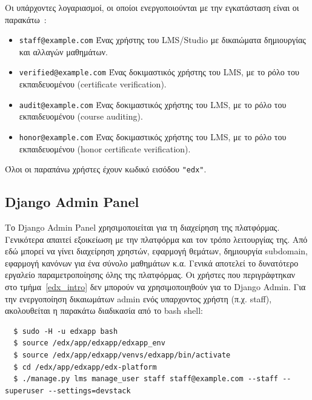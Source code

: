 \documentclass[12pt]{report}
\begin{document}
Οι υπάρχοντες λογαριασμοί, οι οποίοι ενεργοποιούνται με την εγκατάσταση είναι οι παρακάτω~\cite{confluence_2}:
\begin{itemize}
  \item \textlatin{\texttt{staff@example.com}} Ένας χρήστης του \textlatin{LMS/Studio} με δικαιώματα δημιουργίας και αλλαγών μαθημάτων.
  \item \textlatin{\texttt{verified@example.com}} Ένας δοκιμαστικός χρήστης του \textlatin{LMS}, με το ρόλο του εκπαιδευομένου (\textlatin{certificate verification}).
  \item \textlatin{\texttt{audit@example.com}} Ένας δοκιμαστικός χρήστης του \textlatin{LMS}, με το ρόλο του εκπαιδευομένου (\textlatin{course auditing}).
  \item \textlatin{\texttt{honor@example.com}} Ένας δοκιμαστικός χρήστης του \textlatin{LMS}, με το ρόλο του εκπαιδευομένου (\textlatin{honor certificate verification}).
\end{itemize}

Όλοι οι παραπάνω χρήστες έχουν κωδικό εισόδου \textlatin{\texttt{"edx"}}.

\subsection{\textlatin{Django Admin Panel}}\label{edx_panel}
Το \textlatin{Django Admin Panel} χρησιμοποιείται για τη διαχείρηση της πλατφόρμας. Γενικότερα απαιτεί εξοικείωση με την πλατφόρμα και τον τρόπο λειτουργίας της. Από εδώ μπορεί να γίνει διαχείρηση χρηστών, εφαρμογή θεμάτων, δημιουργία \textlatin{subdomain}, εφαρμογή κανόνων για ένα σύνολο μαθημάτων κ.α. Γενικά αποτελεί το δυνατότερο εργαλείο παραμετροποίησης όλης της πλατφόρμας. Οι χρήστες που περιγράφτηκαν στο τμήμα~\ref{edx_intro} δεν μπορούν να χρησιμοποιηθούν για το \textlatin{Django Admin}. Για την ενεργοποίηση δικαιωμάτων \textlatin{admin} ενός υπαρχοντος χρήστη (π.χ. \textlatin{staff}), ακολουθείται η παρακάτω διαδικασία από το \textlatin{bash shell}:
\begin{lstlisting}
  $ sudo -H -u edxapp bash
  $ source /edx/app/edxapp/edxapp_env
  $ source /edx/app/edxapp/venvs/edxapp/bin/activate
  $ cd /edx/app/edxapp/edx-platform
  $ ./manage.py lms manage_user staff staff@example.com --staff --superuser --settings=devstack
\end{lstlisting}
\end{document}
